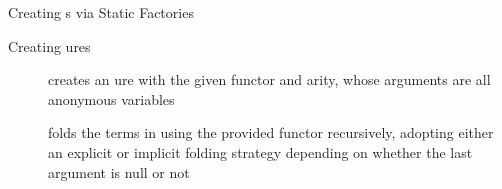 \documentclass[handout]{beamer}
\begin{document}
\begin{frame}[allowframebreaks]{Creating s via Static Factories}
\begin{block}{Creating ures}
\begin{description}
            \item[] creates an ure with the given functor and arity, whose arguments are all anonymous variables

            \item[] folds the terms in  using the provided functor recursively, adopting either an explicit or implicit folding strategy depending on whether the last argument is null or not
        \end{description}
    \end{block}


\end{frame}
\end{document}
